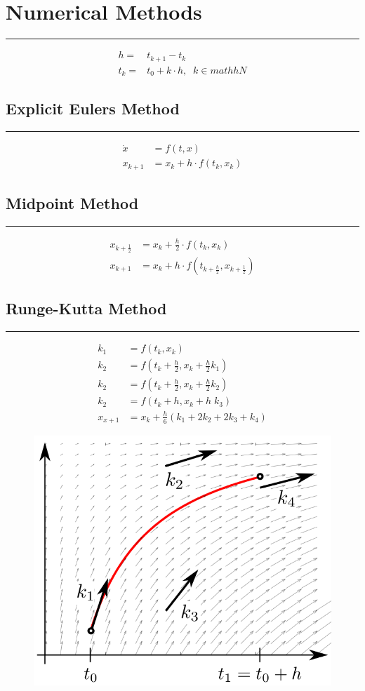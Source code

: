 \section{Numerical Methods}
\noindent\rule[\linienAbstand]{\linewidth}{\linienDickeDick}
\begin{equation}
  \begin{split}
    h =& t_{k+1} - t_k\\
    t_k =& t_0 + k \cdot h, \;\; k \in mathh{N}
  \end{split}
\end{equation}

\subsection{Explicit Eulers Method}
\noindent\rule[\linienAbstand]{\linewidth}{\linienDicke}
\begin{equation}
  \begin{split}
    \dot{x} &= f(t, x)\\
    x_{k+1} &= x_k + h \cdot f(t_k, x_k)
  \end{split}
\end{equation}

\subsection{Midpoint Method}
\noindent\rule[\linienAbstand]{\linewidth}{\linienDicke}
\begin{equation}
  \begin{split}
    x_{k+\frac{1}{2}} &= x_k + \frac{h}{2} \cdot f(t_k, x_k)\\
    x_{k+1}           &= x_k + h \cdot f(t_{k+\frac{h}{2}}, x_{k+\frac{1}{2}})
  \end{split}
\end{equation}

\subsection{Runge-Kutta Method}
\noindent\rule[\linienAbstand]{\linewidth}{\linienDicke}
\begin{equation}
  \begin{split}
    k_1 &= f(t_k, x_k)\\
    k_2 &= f(t_k + \frac{h}{2}, x_k + \frac{h}{2}k_1)\\
    k_2 &= f(t_k + \frac{h}{2}, x_k + \frac{h}{2}k_2)\\
    k_2 &= f(t_k + h, x_k +h \; k_3)\\
    x_{x+1} &= x_k + \frac{h}{6}(k_1 + 2k_2 + 2k_3 + k_4)
  \end{split}
\end{equation}

\begin{figure}[H]
  \centering
  \includegraphics[width=0.5\linewidth]{Pics/runge.png}
\end{figure}
